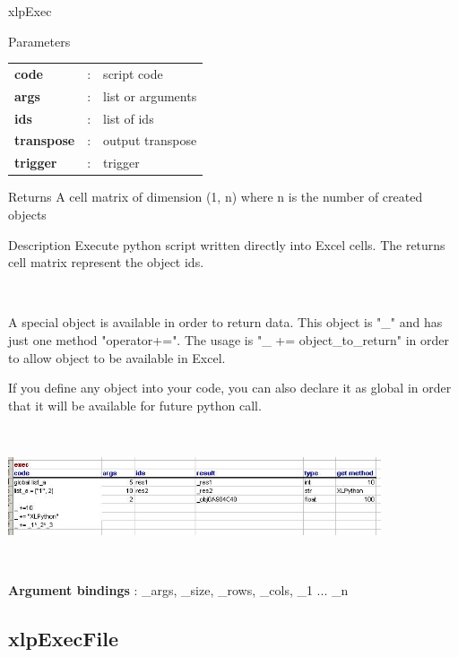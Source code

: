 \begin{xlpfunctitle}{xlpExec}

\begin{xlpfunc}{Parameters}
\begin{tabular}{p{3.5cm}cl}
\textbf{code}& : & script code \\
\textbf{args}& : & list or arguments \\
\textbf{ids}& : & list of ids \\
\textbf{transpose}& : & output transpose \\
\textbf{trigger}& : & trigger \\
\end{tabular}
\end{xlpfunc}


\begin{xlpfunc}{Returns}
A cell matrix of dimension (1, n) where n is the number of created objects  
\end{xlpfunc}

\begin{xlpfunc}{Description}
Execute python script written directly into Excel cells. The returns cell matrix represent the object ids.


\

A special object is available in order to return data. This object is "\_" and has just one method "operator+=". The usage is "\_ += object\_to\_return" in order to allow object to be available in Excel.

If you define any object into your code, you can also declare it as global in order that it will be available for future python call.

\

\includegraphics[width=11cm]{images/exec.jpg}

\

\textbf{Argument bindings} : \_args, \_size, \_rows, \_cols, \_1 ... \_n
 
\end{xlpfunc}
\end{xlpfunctitle}



\subsection{xlpExecFile}



